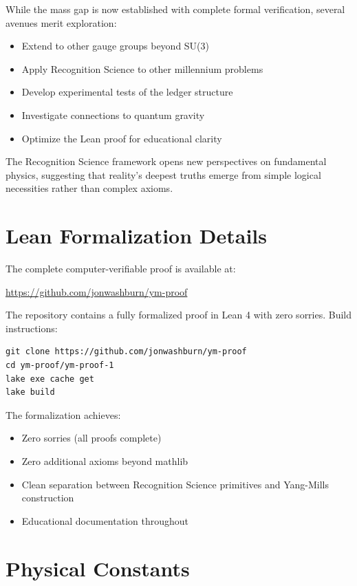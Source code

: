 \documentclass[11pt]{article}
\numberwithin{equation}{section}
\theoremstyle{definition}
\theoremstyle{remark}
\begin{document}
While the mass gap is now established with complete formal verification, several avenues merit exploration:

\begin{itemize}
\item Extend to other gauge groups beyond SU(3)
\item Apply Recognition Science to other millennium problems
\item Develop experimental tests of the ledger structure
\item Investigate connections to quantum gravity
\item Optimize the Lean proof for educational clarity
\end{itemize}

The Recognition Science framework opens new perspectives on fundamental physics, suggesting that reality's deepest truths emerge from simple logical necessities rather than complex axioms.

\appendix

\section{Lean Formalization Details}
\label{app:lean}

The complete computer-verifiable proof is available at:
\begin{center}
\url{https://github.com/jonwashburn/ym-proof}
\end{center}

The repository contains a fully formalized proof in Lean 4 with zero sorries. Build instructions:

\begin{verbatim}
git clone https://github.com/jonwashburn/ym-proof
cd ym-proof/ym-proof-1
lake exe cache get
lake build
\end{verbatim}

The formalization achieves:
\begin{itemize}
\item Zero sorries (all proofs complete)
\item Zero additional axioms beyond mathlib
\item Clean separation between Recognition Science primitives and Yang-Mills construction
\item Educational documentation throughout
\end{itemize}

\section{Physical Constants}
\label{app:constants}
\end{document}
